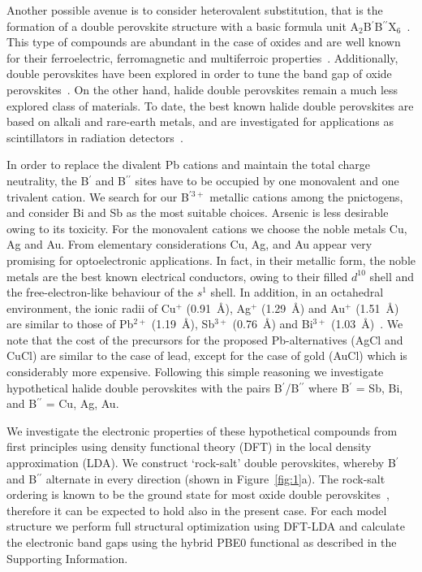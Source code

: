 \documentclass[journal=jpcl,manuscript=letter,layout=traditional]{achemso}
\begin{document}
Another possible avenue is to consider heterovalent substitution, that is the formation of a double perovskite structure with
a basic formula unit A$_2$B$^\prime$B$^{\prime\prime}$X$_6$~\cite{Vasala2015}. This type of compounds are abundant in the case of oxides
and are well known for their ferroelectric, ferromagnetic and multiferroic properties~\cite{Vasala2015}.
Additionally, double perovskites have been explored in order to tune the band gap of oxide perovskites~\cite{Nechache2015, Berger2012}.
On the other hand,  halide double perovskites remain a much less explored class of materials. To date, the best
known halide double perovskites are based on alkali and rare-earth metals, and are investigated for applications as
scintillators in radiation detectors~\cite{Loef2002}.

In order to replace the divalent Pb cations and maintain the total charge neutrality, the B$^\prime$ and B$^{\prime\prime}$ sites
have to be occupied by one monovalent and one trivalent cation. We search for our B$^{\prime3+}$ metallic cations among the pnictogens,
and consider Bi and Sb as the most suitable choices. Arsenic is less desirable owing to its toxicity. For the monovalent cations
we choose the noble metals Cu, Ag and Au. From elementary considerations Cu, Ag, and Au appear very promising for optoelectronic
applications. In fact, in their metallic form, the noble metals are the best known electrical conductors, owing to their filled
$d^{10}$ shell and the free-electron-like behaviour of the $s^1$ shell. In addition, in an octahedral environment, the ionic radii
of Cu$^+$ (0.91~\AA), Ag$^+$ (1.29~\AA) and Au$^+$ (1.51~\AA) are similar to those of Pb$^{2+}$ (1.19~\AA), Sb$^{3+}$ (0.76~\AA)
and Bi$^{3+}$ (1.03~\AA)~\cite{Shannon}. We note that the cost of the precursors for the proposed Pb-alternatives (AgCl and CuCl) are similar to the case of lead, except for the case of gold (AuCl) which is considerably more expensive. Following this simple
reasoning we investigate hypothetical halide double perovskites with the pairs B$^\prime$/B$^{\prime\prime}$ where B$^\prime$ =
Sb, Bi, and B$^{\prime\prime}$ = Cu, Ag, Au.

We investigate the electronic properties of these hypothetical compounds from first principles using density functional theory (DFT) in the local density approximation (LDA).
We construct `rock-salt' double perovskites, whereby B$^\prime$ and B$^{\prime\prime}$ alternate in every direction (shown
in Figure~\ref{fig:1}a). The rock-salt ordering is known to be the ground state for most oxide double perovskites~\cite{Vasala2015},
therefore it can be expected to hold also in the present case. For each model structure we perform full structural optimization
using DFT-LDA and calculate the electronic band gaps using the hybrid PBE0 functional as described in the Supporting Information.
\end{document}
